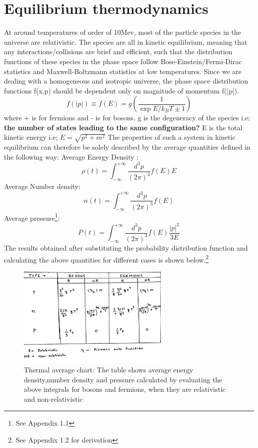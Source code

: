 \documentclass[12pt,a4paper,oneside]{book}
\begin{document}
\section{Equilibrium thermodynamics}
At around temperatures of order of 10Mev, most of the particle species in the universe are relativistic. The species are all in kinetic equilibrium, meaning that any interactions/collisions are brief and efficient, such that the distribution functions of these species in the phase space follow Bose-Einstein/Fermi-Dirac statistics and Maxwell-Boltzmann statistics at low temperatures. Since we are dealing with a homogeneous and isotropic universe, the phase space distribution functions f(x,p) should be dependent only on magnitude of momentum f(|p|).
\begin{equation}
f(|p|) \equiv f(E) = g( \frac{1}{\exp{E/k_{B}T} \pm 1}  )
\end{equation}
where + is for fermions and - is for bosons. g is the degeneracy of the species i.e; \textbf{the number of states leading to the same configuration?}  E is the total kinetic energy i.e; $E = \sqrt{p^2+m^2}$
\newline The properties of such a system in kinetic equilibrium can therefore be solely described by the average quantities defined in the following way:
\newline  Average Energy Density :
\begin{equation}
    \rho(t) = \int_{-\infty}^{+\infty}\frac{d^3p}{(2\pi)^3}f(E) E
\end{equation}
\newline Average Number density:
\begin{equation}
    n(t) = \int_{-\infty}^{+\infty}\frac{d^3p}{(2\pi)^3}f(E) 
\end{equation}
\newline Average pressure\footnote{See Appendix 1.1}:
\begin{equation}
    P(t) = \int_{-\infty}^{+\infty}\frac{d^3p}{(2\pi)^3}f(E) \frac{|p|^2}{3E}
\end{equation}
The results obtained after substituting the probability distribution function and calculating the above quantities for different cases is shown below.\footnote{See Appendix 1.2 for derivation}
\begin{figure}[h]
    \centering
    \includegraphics[width = 0.65\textwidth]{thermal_average_chart.jpg}
    \caption{Thermal average chart:  The table shows average energy density,number density and pressure calculated by evaluating the above integrals for bosons and fermions, when they are relativistic and non-relativistic }
    \label{fig:my_label}
\end{figure}
\end{document}
